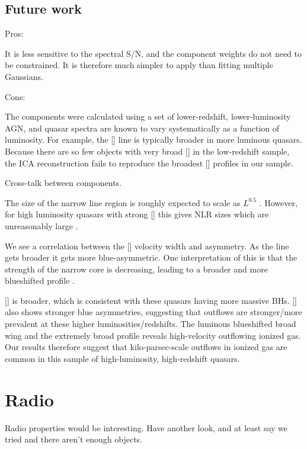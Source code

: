 \subsection{Future work}

Pros:

It is less sensitive to the spectral S/N, and the component weights do not need to be constrained. 
It is therefore much simpler to apply than fitting multiple Gaussians. 

Cons:

The components were calculated using a set of lower-redshift, lower-luminosity AGN, and quasar spectra are known to vary systematically as a function of luminosity. 
For example, the [] line is typically broader in more luminous quasars. 
Because there are so few objects with very broad [] in the low-redshift sample, the ICA reconstruction fails to reproduce the broadest [] profiles in our sample. 

Cross-talk between components. 






The size of the narrow line region is roughly expected to scale as $L^{0.5}$ \citep[e.g.][]{netzer04}. 
However, for high luminosity quasars with strong [] this gives NLR sizes which are unreasonably large \citep[$\sim$100 kpc;][]{netzer04}. 




We see a correlation between the [] velocity width and asymmetry. 
As the line gets broader it gets more blue-asymmetric. 
One interpretation of this is that the strength of the narrow core is decreasing, leading to a broader and more blueshifted profile \citep[e.g.][]{shen14}. 


[] is broader, which is consistent with these quasars having more massive BHs. 
[] also shows stronger blue asymmetries, suggesting that outflows are stronger/more prevalent at these higher luminosities/redshifts. 
The luminous blueshifted broad wing and the extremely broad profile reveals high-velocity outflowing ionized gas. 
Our results therefore suggest that kilo-parsec-scale outflows in ionized gas are common in this sample of high-luminosity, high-redshift quasars.



\section{Radio}

Radio properties would be interesting. 
Have another look, and at least say we tried and there aren't enough objects.